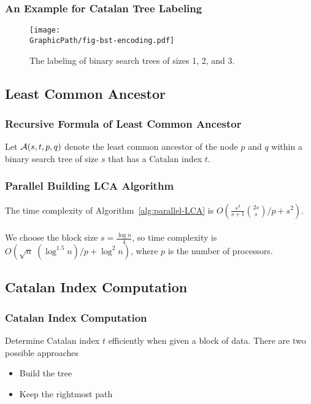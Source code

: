 \begin{frame}
	\frametitle{An Example for Catalan Tree Labeling}
	\begin{figure}[!thb]
	  \centering
	  \texttt{[image: \\GraphicPath/fig-bst-encoding.pdf]}
	  \caption{The labeling of binary search trees of sizes 1, 2, and 3.}
	  \label{fig:labelingBST}
	\end{figure}
\end{frame}

\subsection{Least Common Ancestor}
\begin{frame}
	\frametitle{Recursive Formula of Least Common Ancestor}
	Let ${\cal A}(s, t, p, q)$ denote the least common ancestor of the
	node $p$ and $q$ within a binary search tree of size $s$ that has a
	Catalan index $t$.
	\begin{center}
		\scalebox{.7} { \begin{minipage}{1.4\textwidth}
			
			\end{minipage}
		}
	\end{center}
\end{frame}

\begin{frame}
	\frametitle{Parallel Building LCA Algorithm}
	The time complexity of Algorithm~\ref{alg:parallel-LCA} is
	$O(\frac{s^3}{s+1} \binom{2s}{s} / p + s^2)$.
	\\~\\
	We choose the block size $s = {{\frac{\log n}{4}}}$, so time
	complexity is $O(\sqrt{n} \; (\log^{1.5} n) / p + \log^2 n )$, where
	$p$ is the number of processors.
	\begin{center}
		\scalebox{.7} { \begin{minipage}{1.4\textwidth}
			
			\end{minipage}
		}
	\end{center}
\end{frame}

\subsection{Catalan Index Computation}

\begin{frame}
	\frametitle{Catalan Index Computation}
	Determine Catalan index $t$ efficiently when given a block of data.
	There are two possible approaches

	\begin{itemize}
		\setlength\itemsep{1em}
		\item Build the tree
		\item Keep the rightmost path
	\end{itemize}
\end{frame}

